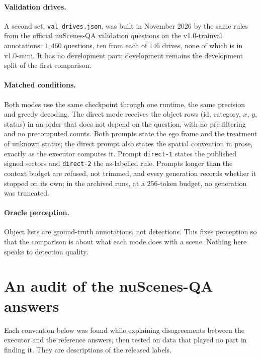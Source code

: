 \documentclass[11pt,a4paper]{article}
\newcommand{\code}[1]{\texttt{\small #1}}
\begin{document}
\paragraph{Validation drives.} A second set, \code{val\_drives.json}, was built in November 2026 by the same
rules from the official nuScenes-QA validation questions on the v1.0-trainval
annotations: $1{,}460$ questions, ten from each of $146$ drives, none of
which is in v1.0-mini. It has no development part; development remains the
development split of the first comparison.

\paragraph{Matched conditions.} Both modes use the same checkpoint through
one runtime, the same precision and greedy decoding. The direct mode receives
the object rows (id, category, $x$, $y$, status) in an order that does not
depend on the question, with no pre-filtering and no precomputed counts. Both
prompts state the ego frame and the treatment of unknown status; the direct
prompt also states the spatial convention in prose, exactly as the executor
computes it. Prompt \code{direct-1} states the published signed sectors and
\code{direct-2} the as-labelled rule. Prompts longer than the context budget
are refused, not trimmed, and every generation records whether it stopped on
its own; in the archived runs, at a $256$-token budget, no generation was
truncated.

\paragraph{Oracle perception.} Object lists are ground-truth annotations, not
detections. This fixes perception so that the comparison is about what each
mode does with a scene. Nothing here speaks to detection quality.

\section{An audit of the nuScenes-QA answers}
\label{sec:audit}

Each convention below was found while explaining disagreements between the
executor and the reference answers, then tested on data that played no part
in finding it. They are descriptions of the released labels.
\end{document}
